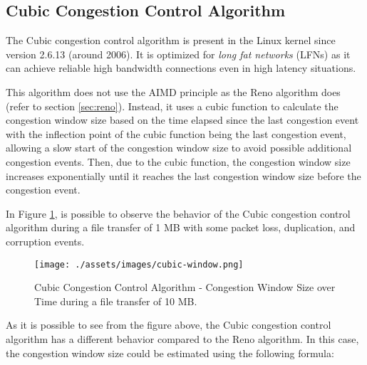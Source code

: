 \documentclass[a4paper, 11pt]{article}
\begin{document}
\pagebreak

\subsection{Cubic Congestion Control Algorithm}

The Cubic congestion control algorithm is present in the Linux kernel since version 2.6.13 (around 2006). It is optimized for \textit{long fat networks} (LFNs) as it can achieve reliable high bandwidth connections even in high latency situations. \cite{wiki:cubic}

This algorithm does not use the AIMD principle as the Reno algorithm does (refer to section \ref{sec:reno}). Instead, it uses a cubic function to calculate the congestion window size based on the time elapsed since the last congestion event with the inflection point of the cubic function being the last congestion event, allowing a slow start of the congestion window size to avoid possible additional congestion events. Then, due to the cubic function, the congestion window size increases exponentially until it reaches the last congestion window size before the congestion event.

In Figure \ref{fig:cubic}, is possible to observe the behavior of the Cubic congestion control algorithm during a file transfer of 1 MB with some packet loss, duplication, and corruption events.

\begin{figure}[h]
	\centering
	\texttt{[image: ./assets/images/cubic-window.png]}
	\caption{Cubic Congestion Control Algorithm - Congestion Window Size over Time during a file transfer of 10 MB.}
	\label{fig:cubic}
\end{figure}

As it is possible to see from the figure above, the Cubic congestion control algorithm has a different behavior compared to the Reno algorithm. In this case, the congestion window size could be estimated using the following formula: \cite{wiki:cubic}
\end{document}
